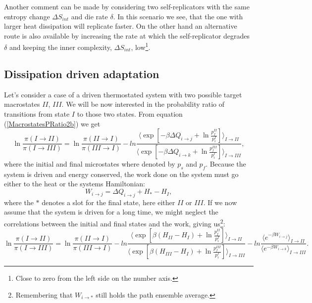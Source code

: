 \documentclass[a4paper,12pt]{article}
\begin{document}
Another comment can be made by considering two self-replicators with the same entropy change $\Delta S_{int}$ and die rate $\delta$. In this scenario we see, that the one with larger heat dissipation will replicate faster.
On the other hand an alternative route is also available by increasing the rate at which the self-replicator degrades $\delta $ and keeping the inner complexity, $\Delta S_{int}$, low\footnote{Close to zero from the left side on the number axis.}.

\subsection{Dissipation driven adaptation}
\label{DissipationAdaptationSection}
Let's consider a case of a driven thermostated system with two possible target macrostates $II$, $III$. We will be now interested in the probability ratio of transitions from state $I$ to those two states. From equation (\ref{MacrostatesPRatio2b}) we get
\begin{equation}
\label{DissipationDrivenEq}
  \ln \frac{\pi(I \to II)}{\pi(I \to III)} = \ln \frac{\pi(II \to I)}{\pi(III \to I)}- ln \frac{ \langle \exp[-\beta \Delta Q_{i \to j} + \ln \frac{p_f^{II}}{p_i^{I}}] \rangle_{I \to II}}{ \langle \exp[-\beta \Delta Q_{i \to k} + \ln \frac{p_f^{III}}{p_i^{I}}] \rangle_{I \to III}},
\end{equation}
where the initial and final microstates where denoted by $p_s$ and $p_f$.
Because the system is driven and energy conserved, the work done on the system must go either to the heat or the systems Hamiltonian:
\begin{equation}
  W_{i \to j}=  \Delta Q_{i \to j} + H_*- H_I,
\end{equation}
where the $*$ denotes a slot for the final state, here either $II$ or $III$.
If we now assume that the system is driven for a long time, we might neglect the correlations between the initial and final states and the work, giving us\footnote{Remembering that $W_{i \to *}$ still holds the path ensemble average.}:
\begin{equation}
  \ln \frac{\pi(I \to II)}{\pi(I \to III)} = \ln \frac{\pi(II \to I)}{\pi(III \to I)}- ln \frac{ \langle \exp[\beta (H_{II}-H_I) + \ln \frac{p_f^{II}}{p_i^{I}}] \rangle_{I \to II}}{ \langle \exp[\beta (H_{III}-H_I) + \ln \frac{p_f^{III}}{p_i^{I}}] \rangle_{I \to III}}-ln \frac{\langle e^{ - \beta W_{i \to j}} \rangle_{I \to II}}{\langle e^{ - \beta W_{i \to k}} \rangle_{I \to III}}.
\end{equation}
\end{document}
